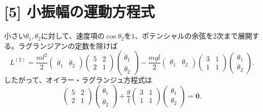 \documentclass[11pt,a4paper]{article}
\begin{document}
\section*{[5] 小振幅の運動方程式}
小さい$\theta_1,\theta_2$に対して、速度項の$\cos\theta_2$を$1$、ポテンシャルの余弦を2次まで展開する。ラグランジアンの定数を除けば
\begin{equation}
  L^{(2)}=\frac{ml^2}{2}
  \begin{pmatrix}\dot\theta_1&\dot\theta_2\end{pmatrix}
  \begin{pmatrix}5&2\\2&1\end{pmatrix}
  \begin{pmatrix}\dot\theta_1\\\dot\theta_2\end{pmatrix}
  -\frac{mgl}{2}
  \begin{pmatrix}\theta_1&\theta_2\end{pmatrix}
  \begin{pmatrix}3&1\\1&1\end{pmatrix}
  \begin{pmatrix}\theta_1\\\theta_2\end{pmatrix}.
\end{equation}
したがって、オイラー・ラグランジュ方程式は
\begin{equation}
  \boxed{\begin{pmatrix}5&2\\2&1\end{pmatrix}
  \begin{pmatrix}\ddot\theta_1\\\ddot\theta_2\end{pmatrix}
  +\frac{g}{l}\begin{pmatrix}3&1\\1&1\end{pmatrix}
  \begin{pmatrix}\theta_1\\\theta_2\end{pmatrix}=\boldsymbol 0.}
\end{equation}
\end{document}
